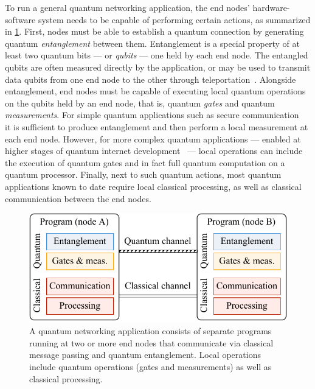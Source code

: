 To run a general quantum networking application, the end nodes' hardware-software system needs to be
capable of performing certain actions, as summarized in \cref{fig:quantum-internet}. First, nodes
must be able to establish a quantum connection by generating quantum \emph{entanglement} between
them. Entanglement is a special property of at least two quantum bits --- or \emph{qubits} --- one
held by each end node. The entangled qubits are often measured directly by the application, or may
be used to transmit data qubits from one end node to the other through
teleportation~\cite{bennett_1993_teleportation}. Alongside entanglement, end nodes must be capable
of executing local quantum operations on the qubits held by an end node, that is, quantum
\emph{gates} and quantum \emph{measurements}. For simple quantum applications such as secure
communication~\cite{ekert_1991_e91, bennett_2014_bb84} it is sufficient to produce entanglement and
then perform a local measurement at each end node. However, for more complex quantum applications
--- enabled at higher stages of quantum internet development~\cite{wehner_2018_stages} --- local
operations can include the execution of quantum gates and in fact full quantum computation on a
quantum processor. Finally, next to such quantum actions, most quantum applications known to date
require local classical processing, as well as classical communication between the end nodes.

\begin{figure}[b]
    \centering
    \includegraphics[width=0.6\linewidth]{figures/quantum-internet.pdf}
    \caption{
        A quantum networking application consists of separate programs running at two or more end
        nodes that communicate via classical message passing and quantum entanglement. Local
        operations include quantum operations (gates and measurements) as well as classical
        processing.
    }
    \label{fig:quantum-internet}
\end{figure}

